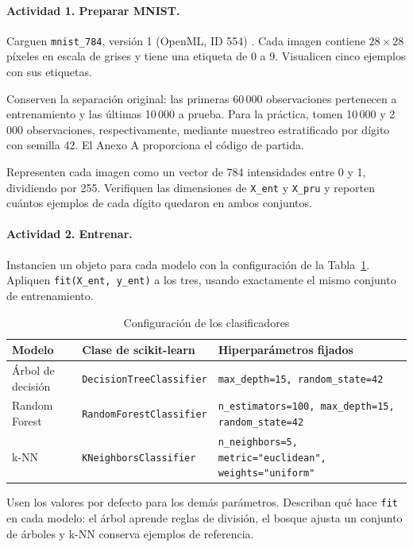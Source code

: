 \documentclass[11pt,a4paper]{article}
\begin{document}
\paragraph{Actividad 1. Preparar MNIST.}
Carguen \texttt{mnist\_784}, versión 1 (OpenML, ID 554) \cite{openml_mnist}. Cada imagen contiene $28 \times 28$ píxeles en escala de grises y tiene una etiqueta de 0 a 9. Visualicen cinco ejemplos con sus etiquetas.

Conserven la separación original: las primeras 60\,000 observaciones pertenecen a entrenamiento y las últimas 10\,000 a prueba. Para la práctica, tomen 10\,000 y 2\,000 observaciones, respectivamente, mediante muestreo estratificado por dígito con semilla 42. El Anexo A proporciona el código de partida.

Representen cada imagen como un vector de 784 intensidades entre 0 y 1, dividiendo por 255. Verifiquen las dimensiones de \texttt{X\_ent} y \texttt{X\_pru} y reporten cuántos ejemplos de cada dígito quedaron en ambos conjuntos.

\paragraph{Actividad 2. Entrenar.}
Instancien un objeto para cada modelo con la configuración de la Tabla~\ref{tab:configuracion}. Apliquen \texttt{fit(X\_ent, y\_ent)} a los tres, usando exactamente el mismo conjunto de entrenamiento.

\begin{table}[H]
\centering
\caption{Configuración de los clasificadores}
\label{tab:configuracion}
\renewcommand{\arraystretch}{1.2}
\begin{tabularx}{\textwidth}{l l X}
\toprule
\textbf{Modelo} & \textbf{Clase de scikit-learn} & \textbf{Hiperparámetros fijados} \\
\midrule
Árbol de decisión & \texttt{DecisionTreeClassifier} \cite{sklearn_dt} & \texttt{max\_depth=15, random\_state=42} \\
\addlinespace
Random Forest & \texttt{RandomForestClassifier} \cite{sklearn_rf} & \texttt{n\_estimators=100, max\_depth=15, random\_state=42} \\
\addlinespace
k-NN & \texttt{KNeighborsClassifier} \cite{sklearn_knn} & \texttt{n\_neighbors=5, metric="euclidean", weights="uniform"} \\
\bottomrule
\end{tabularx}
\end{table}

Usen los valores por defecto para los demás parámetros. Describan qué hace \texttt{fit} en cada modelo: el árbol aprende reglas de división, el bosque ajusta un conjunto de árboles y k-NN conserva ejemplos de referencia.
\end{document}
